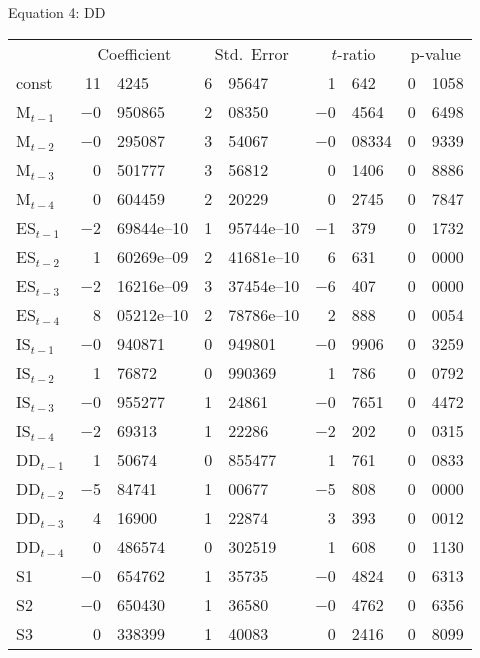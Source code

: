 \documentclass[11pt]{article}
\begin{document}
\begin{center}

Equation 4: DD\\

\vspace{1em}

\begin{tabular}{lr@{.}lr@{.}lr@{.}lr@{.}l}
  &
 \multicolumn{2}{c}{Coefficient} &
  \multicolumn{2}{c}{Std.\ Error} &
   \multicolumn{2}{c}{$t$-ratio} &
    \multicolumn{2}{c}{p-value} \\[1ex]
const &
  11&4245 &
    6&95647 &
      1&642 &
        0&1058 \\
M$_{t-1}$ &
  $-$0&950865 &
    2&08350 &
      $-$0&4564 &
        0&6498 \\
M$_{t-2}$ &
  $-$0&295087 &
    3&54067 &
      $-$0&08334 &
        0&9339 \\
M$_{t-3}$ &
  0&501777 &
    3&56812 &
      0&1406 &
        0&8886 \\
M$_{t-4}$ &
  0&604459 &
    2&20229 &
      0&2745 &
        0&7847 \\
ES$_{t-1}$ &
  $-$2&69844\textrm{e--10} &
    1&95744\textrm{e--10} &
      $-$1&379 &
        0&1732 \\
ES$_{t-2}$ &
  1&60269\textrm{e--09} &
    2&41681\textrm{e--10} &
      6&631 &
        0&0000 \\
ES$_{t-3}$ &
  $-$2&16216\textrm{e--09} &
    3&37454\textrm{e--10} &
      $-$6&407 &
        0&0000 \\
ES$_{t-4}$ &
  8&05212\textrm{e--10} &
    2&78786\textrm{e--10} &
      2&888 &
        0&0054 \\
IS$_{t-1}$ &
  $-$0&940871 &
    0&949801 &
      $-$0&9906 &
        0&3259 \\
IS$_{t-2}$ &
  1&76872 &
    0&990369 &
      1&786 &
        0&0792 \\
IS$_{t-3}$ &
  $-$0&955277 &
    1&24861 &
      $-$0&7651 &
        0&4472 \\
IS$_{t-4}$ &
  $-$2&69313 &
    1&22286 &
      $-$2&202 &
        0&0315 \\
DD$_{t-1}$ &
  1&50674 &
    0&855477 &
      1&761 &
        0&0833 \\
DD$_{t-2}$ &
  $-$5&84741 &
    1&00677 &
      $-$5&808 &
        0&0000 \\
DD$_{t-3}$ &
  4&16900 &
    1&22874 &
      3&393 &
        0&0012 \\
DD$_{t-4}$ &
  0&486574 &
    0&302519 &
      1&608 &
        0&1130 \\
S1 &
  $-$0&654762 &
    1&35735 &
      $-$0&4824 &
        0&6313 \\
S2 &
  $-$0&650430 &
    1&36580 &
      $-$0&4762 &
        0&6356 \\
S3 &
  0&338399 &
    1&40083 &
      0&2416 &
        0&8099 \\
\end{tabular}


\end{center}
\end{document}
